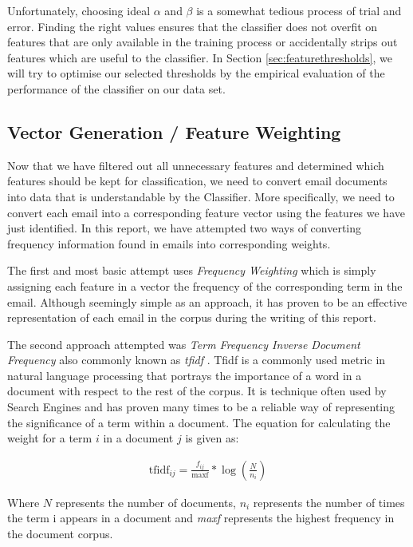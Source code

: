 Unfortunately, choosing ideal \(\alpha \) and \(\beta\) is a somewhat tedious process of trial and error.
Finding the right values ensures that the classifier does not overfit on features that are only available in the training process or accidentally strips out features which are useful to the classifier.
In Section \ref{sec:featurethresholds}, we will try to optimise our selected thresholds by the empirical evaluation of the performance of the classifier on our data set.

\subsection{Vector Generation / Feature Weighting}

Now that we have filtered out all unnecessary features and determined which features should be kept for classification, we need to convert email documents into data that is understandable by the Classifier. More specifically, we need to convert each email into a corresponding feature vector using the features we have just identified. In this report, we have attempted two ways of converting frequency information found in emails into corresponding weights. 

The first and most basic attempt uses \emph{Frequency Weighting} which is simply assigning each feature in a vector the frequency of the corresponding term in the email. Although seemingly simple as an approach, it has proven to be an effective representation of each email in the corpus during the writing of this report.

The second approach attempted was \emph{Term Frequency Inverse Document Frequency} also commonly known as \emph{tfidf} \cite{tfidf1973}. Tfidf is a commonly used metric in natural language processing that portrays the importance of a word in a document with respect to the rest of the corpus. It is technique often used by Search Engines and has proven many times to be a reliable way of representing the significance of a term within a document. The equation for calculating the weight for a term $i$ in a document $j$ is given as:

\begin{align*}
	\textrm{tfidf}_{ij} = \frac{f_{ij}}{\textrm{maxf}} * \log\left(\frac{N}{n_i}\right)
\end{align*}

Where $N$ represents the number of documents, $n_i$ represents the number of times the term i appears in a document and \emph{maxf} represents the highest frequency in the document corpus.

